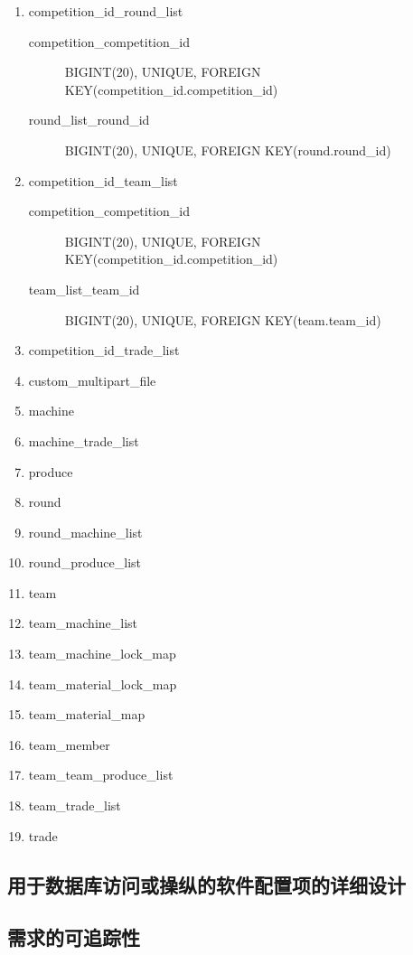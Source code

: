 \documentclass{article}
\begin{document}
{\begin{enumerate}
  \item competition\_id\_round\_list
    \begin{description}
      \item[competition\_competition\_id] BIGINT(20), UNIQUE, FOREIGN KEY(competition\_id.competition\_id)
      \item[round\_list\_round\_id] BIGINT(20), UNIQUE, FOREIGN KEY(round.round\_id)
    \end{description}
  \item competition\_id\_team\_list
    \begin{description}
      \item[competition\_competition\_id] BIGINT(20), UNIQUE, FOREIGN KEY(competition\_id.competition\_id)
      \item[team\_list\_team\_id] BIGINT(20), UNIQUE, FOREIGN KEY(team.team\_id)
    \end{description}
  \item competition\_id\_trade\_list
  \item custom\_multipart\_file
  \item machine
  \item machine\_trade\_list
  \item produce
  \item round
  \item round\_machine\_list
  \item round\_produce\_list
  \item team
  \item team\_machine\_list
  \item team\_machine\_lock\_map
  \item team\_material\_lock\_map
  \item team\_material\_map
  \item team\_member
  \item team\_team\_produce\_list
  \item team\_trade\_list
  \item trade
\end{enumerate}
} %

\subsection{用于数据库访问或操纵的软件配置项的详细设计}

\subsection{需求的可追踪性}
\end{document}
